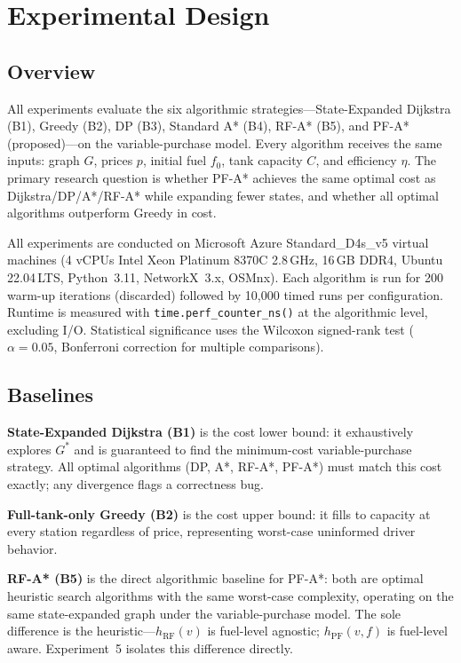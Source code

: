 \chapter{Experimental Design}
\label{ch:experiments}

\section{Overview}

All experiments evaluate the six algorithmic strategies---State-Expanded Dijkstra (B1),
Greedy (B2), DP (B3), Standard A* (B4), RF-A* (B5), and PF-A* (proposed)---on the
variable-purchase model.
Every algorithm receives the same inputs: graph $G$, prices $p$, initial fuel $f_0$, tank
capacity $C$, and efficiency $\eta$.
The primary research question is whether PF-A* achieves the same optimal cost as
Dijkstra/DP/A*/RF-A* while expanding fewer states, and whether all optimal algorithms
outperform Greedy in cost.

All experiments are conducted on Microsoft Azure Standard\_D4s\_v5 virtual machines
(4 vCPUs Intel Xeon Platinum 8370C 2.8\,GHz, 16\,GB DDR4, Ubuntu 22.04\,LTS,
Python~3.11, NetworkX~3.x, OSMnx).
Each algorithm is run for 200 warm-up iterations (discarded) followed by 10,000 timed
runs per configuration.
Runtime is measured with \texttt{time.perf\_counter\_ns()} at the algorithmic level,
excluding I/O.
Statistical significance uses the Wilcoxon signed-rank test ($\alpha=0.05$, Bonferroni
correction for multiple comparisons).

\section{Baselines}

\textbf{State-Expanded Dijkstra (B1)} is the cost lower bound: it exhaustively explores
$G^{*}$ and is guaranteed to find the minimum-cost variable-purchase strategy.
All optimal algorithms (DP, A*, RF-A*, PF-A*) must match this cost exactly; any
divergence flags a correctness bug.

\textbf{Full-tank-only Greedy (B2)} is the cost upper bound: it fills to capacity at every
station regardless of price, representing worst-case uninformed driver behavior.

\textbf{RF-A* (B5)} is the direct algorithmic baseline for PF-A*: both are optimal heuristic
search algorithms with the same worst-case complexity, operating on the same state-expanded
graph under the variable-purchase model.
The sole difference is the heuristic---$h_{\mathrm{RF}}(v)$ is fuel-level agnostic;
$h_{\mathrm{PF}}(v,f)$ is fuel-level aware.
Experiment~5 isolates this difference directly.

